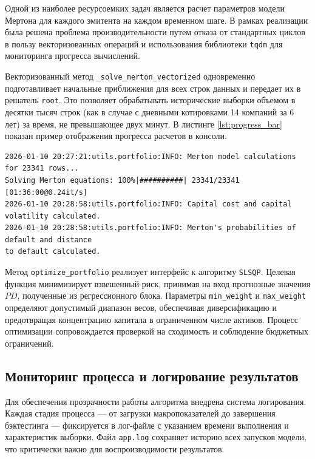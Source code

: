 \documentclass[]{article}
\begin{document}
	Одной из наиболее ресурсоемких задач является расчет параметров модели Мертона для каждого эмитента на каждом временном шаге. В рамках реализации была решена проблема производительности путем отказа от стандартных циклов в пользу векторизованных операций и использования библиотеки \texttt{tqdm} для мониторинга прогресса вычислений.

	Векторизованный метод \texttt{\_solve\_merton\_vectorized} одновременно подготавливает начальные приближения для всех строк данных и передает их в решатель \texttt{root}. Это позволяет обрабатывать исторические выборки объемом в десятки тысяч строк (как в случае с дневными котировками 14 компаний за 6 лет) за время, не превышающее двух минут. В листинге \ref{lst:progress_bar} показан пример отображения прогресса расчетов в консоли.

\begin{lstlisting}[style=terminal, language={}, caption={Визуализация процесса вычисления системы уравнений Мертона}, label={lst:progress_bar}]
2026-01-10 20:27:21:utils.portfolio:INFO: Merton model calculations for 23341 rows...
Solving Merton equations: 100%|##########| 23341/23341 [01:36:00@0.24it/s]
2026-01-10 20:28:58:utils.portfolio:INFO: Capital cost and capital volatility calculated.
2026-01-10 20:28:58:utils.portfolio:INFO: Merton's probabilities of default and distance
to default calculated.
\end{lstlisting}

	Метод \texttt{optimize\_portfolio} реализует интерфейс к алгоритму \texttt{SLSQP}. Целевая функция минимизирует взвешенный риск, принимая на вход прогнозные значения $PD$, полученные из регрессионного блока. Параметры \texttt{min\_weight} и \texttt{max\_weight} определяют допустимый диапазон весов, обеспечивая диверсификацию и предотвращая концентрацию капитала в ограниченном числе активов. Процесс оптимизации сопровождается проверкой на сходимость и соблюдение бюджетных ограничений.

	\subsection{Мониторинг процесса и логирование результатов}

	Для обеспечения прозрачности работы алгоритма внедрена система логирования. Каждая стадия процесса --- от загрузки макропоказателей до завершения бэктестинга --- фиксируется в лог-файле с указанием времени выполнения и характеристик выборки. Файл \texttt{app.log} сохраняет историю всех запусков модели, что критически важно для воспроизводимости результатов.
\end{document}
